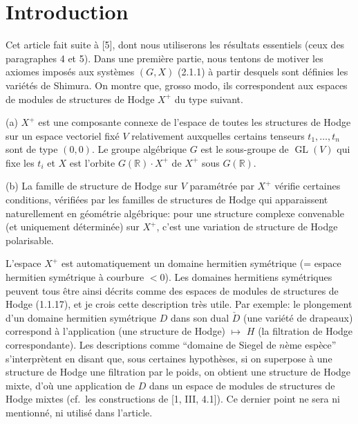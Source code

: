 \documentclass[12pt,a4paper]{article}
\theoremstyle{plain}
\theoremstyle{definition}
\theoremstyle{remark}
\DeclareMathOperator{\GL}{GL}
\newcommand{\RR}{\mathbb{R}}
\begin{document}
\section*{Introduction}

Cet article fait suite \`a [5], dont nous utiliserons les r\'esultats essentiels (ceux des paragraphes 4 et 5). Dans une premi\`ere partie, nous tentons de motiver les axiomes impos\'es aux syst\`emes $(G,X)$ (2.1.1) \`a partir desquels sont d\'efinies les vari\'et\'es de Shimura. On montre que, grosso modo, ils correspondent aux espaces de modules de structures de Hodge $X^+$ du type suivant.

(a) $X^+$ est une composante connexe de l'espace de toutes les structures de Hodge sur un espace vectoriel fix\'e $V$ relativement auxquelles certains tenseurs $t_1,\dots,t_n$ sont de type $(0,0)$. Le groupe alg\'ebrique $G$ est le sous-groupe de $\GL(V)$ qui fixe les $t_i$ et $X$ est l'orbite $G(\RR)\cdot X^+$ de $X^+$ sous $G(\RR)$.

(b) La famille de structure de Hodge sur $V$ param\'etr\'ee par $X^+$ v\'erifie certaines conditions, v\'erifi\'ees par les familles de structures de Hodge qui apparaissent naturellement en g\'eom\'etrie alg\'ebrique: pour une structure complexe convenable (et uniquement d\'etermin\'ee) sur $X^+$, c'est une variation de structure de Hodge polarisable.

L'espace $X^+$ est automatiquement un domaine hermitien sym\'etrique (= espace hermitien sym\'etrique \`a courbure $< 0$). Les domaines hermitiens sym\'etriques peuvent tous \^etre ainsi d\'ecrits comme des espaces de modules de structures de Hodge (1.1.17), et je crois cette description tr\`es utile. Par exemple: le plongement d'un domaine hermitien sym\'etrique $D$ dans son dual $\check{D}$ (une vari\'et\'e de drapeaux) correspond \`a l'application (une structure de Hodge) $\mapsto$ $H$ (la filtration de Hodge correspondante). Les descriptions comme ``domaine de Siegel de $n$\`eme esp\`ece'' s'interpr\`etent en disant que, sous certaines hypoth\`eses, si on superpose \`a une structure de Hodge une filtration par le poids, on obtient une structure de Hodge mixte, d'o\`u une application de $D$ dans un espace de modules de structures de Hodge mixtes (cf.~les constructions de [1, III, 4.1]). Ce dernier point ne sera ni mentionn\'e, ni utilis\'e dans l'article.
\end{document}
